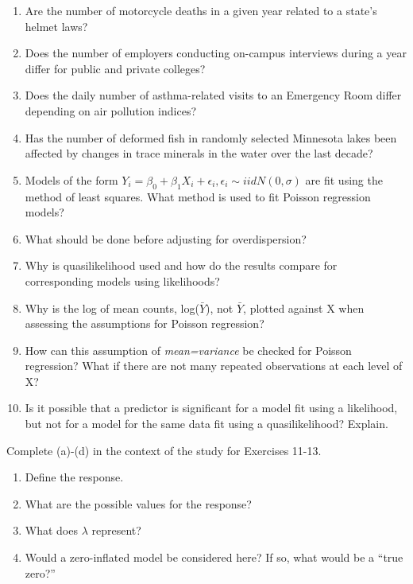\documentclass[
]{krantz}
\providecommand{\tightlist}{%
  \setlength{\itemsep}{0pt}\setlength{\parskip}{0pt}}
\begin{document}
\begin{enumerate}
\def\labelenumi{\arabic{enumi}.}
\item
  Are the number of motorcycle deaths in a given year related to a state's helmet laws?
\item
  Does the number of employers conducting on-campus interviews during a year differ for public and private colleges?
\item
  Does the daily number of asthma-related visits to an Emergency Room differ depending on air pollution indices?
\item
  Has the number of deformed fish in randomly selected Minnesota lakes been affected by changes in trace minerals in the water over the last decade?
\item
  Models of the form \(Y_i=\beta_0+\beta_1X_i+\epsilon_i, \epsilon_i \sim iidN(0,\sigma)\) are fit using the method of least squares. What method is used to fit Poisson regression models?
\item
  What should be done before adjusting for overdispersion?
\item
  Why is quasilikelihood used and how do the results compare for corresponding models using likelihoods?
\item
  Why is the log of mean counts, log(\(\bar{Y}\)), not \(\bar{Y}\), plotted against X when assessing the assumptions for Poisson regression?
\item
  How can this assumption of \emph{mean=variance} be checked for Poisson regression? What if there are not many repeated observations at each level of X?
\item
  Is it possible that a predictor is significant for a model fit using a likelihood, but not for a model for the same data fit using a quasilikelihood? Explain.
\end{enumerate}

Complete (a)-(d) in the context of the study for Exercises 11-13.

\begin{enumerate}
\def\labelenumi{\alph{enumi}.}
\tightlist
\item
  Define the response.
\item
  What are the possible values for the response?\\
\item
  What does \(\lambda\) represent?
\item
  Would a zero-inflated model be considered here? If so, what would be a ``true zero?''
\end{enumerate}
\end{document}
